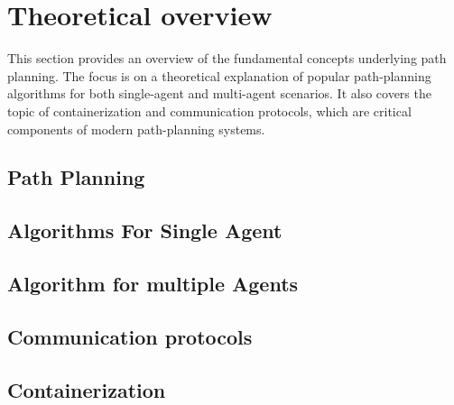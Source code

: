 \chapter{Theoretical overview}
This section provides an overview of the fundamental concepts underlying path planning. The focus is on a theoretical explanation of popular path-planning algorithms for both single-agent and multi-agent scenarios. It also covers the topic of containerization and communication protocols, which are critical components of modern path-planning systems.
\section{Path Planning}


\section{Algorithms For Single Agent}


\section{Algorithm for multiple Agents}


\section{Communication protocols}


\section{Containerization}

